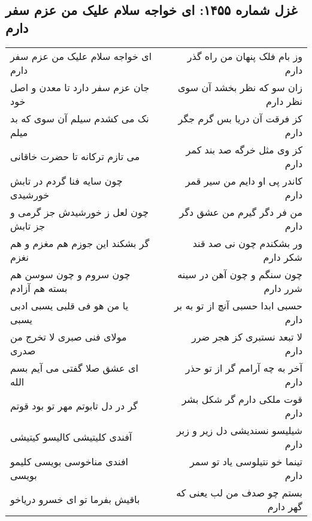 \begin{center}
\section*{غزل شماره ۱۴۵۵: ای خواجه سلام علیک من عزم سفر دارم}
\label{sec:1455}
\begin{longtable}{l p{0.5cm} r}
ای خواجه سلام علیک من عزم سفر دارم
&&
وز بام فلک پنهان من راه گذر دارم
\\
جان عزم سفر دارد تا معدن و اصل خود
&&
زان سو که نظر بخشد آن سوی نظر دارم
\\
نک می کشدم سیلم آن سوی که بد میلم
&&
کز فرقت آن دریا بس گرم جگر دارم
\\
می تازم ترکانه تا حضرت خاقانی
&&
کز وی مثل خرگه صد بند کمر دارم
\\
چون سایه فنا گردم در تابش خورشیدی
&&
کاندر پی او دایم من سیر قمر دارم
\\
چون لعل ز خورشیدش جز گرمی و جز تابش
&&
من فر دگر گیرم من عشق دگر دارم
\\
گر بشکند این جوزم هم مغزم و هم نغزم
&&
ور بشکندم چون نی صد قند شکر دارم
\\
چون سروم و چون سوسن هم بسته هم آزادم
&&
چون سنگم و چون آهن در سینه شرر دارم
\\
یا من هو فی قلبی یسبی ادبی یسبی
&&
حسبی ابدا حسبی آنچ از تو به بر دارم
\\
مولای فنی صبری لا تخرج من صدری
&&
لا تبعد نستبری کز هجر ضرر دارم
\\
ای عشق صلا گفتی می آیم بسم الله
&&
آخر به چه آرامم گر از تو حذر دارم
\\
گر در دل تابوتم مهر تو بود قوتم
&&
قوت ملکی دارم گر شکل بشر دارم
\\
آفندی کلیتیشی کالیسو کیتیشی
&&
شیلیسو نسندیشی دل زیر و زبر دارم
\\
افندی مناخوسی بویسی کلیمو بویسی
&&
تینما خو نتیلوسی یاد تو سمر دارم
\\
باقیش بفرما تو ای خسرو دریاخو
&&
بستم چو صدف من لب یعنی که گهر دارم
\\
\end{longtable}
\end{center}
